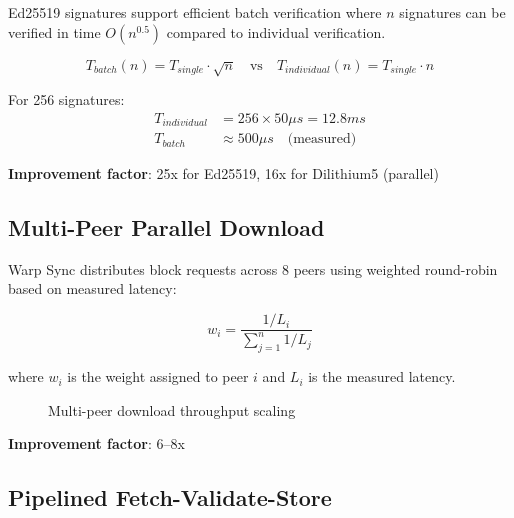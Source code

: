 \documentclass[11pt,a4paper]{article}
\begin{document}
Ed25519 signatures support efficient batch verification where $n$ signatures can be verified in time $O(n^{0.5})$ compared to individual verification.

\begin{equation}
T_{batch}(n) = T_{single} \cdot \sqrt{n} \quad \text{vs} \quad T_{individual}(n) = T_{single} \cdot n
\end{equation}

For 256 signatures:
\begin{align}
T_{individual} &= 256 \times 50\mu s = 12.8ms \\
T_{batch} &\approx 500\mu s \quad \text{(measured)}
\end{align}

\textbf{Improvement factor}: 25x for Ed25519, 16x for Dilithium5 (parallel)

\subsection{Multi-Peer Parallel Download}

Warp Sync distributes block requests across 8 peers using weighted round-robin based on measured latency:

\begin{equation}
w_i = \frac{1/L_i}{\sum_{j=1}^{n} 1/L_j}
\end{equation}

where $w_i$ is the weight assigned to peer $i$ and $L_i$ is the measured latency.

\begin{figure}[h]
\centering
{}
\caption{Multi-peer download throughput scaling}
\end{figure}

\textbf{Improvement factor}: 6--8x

\subsection{Pipelined Fetch-Validate-Store}
\end{document}

